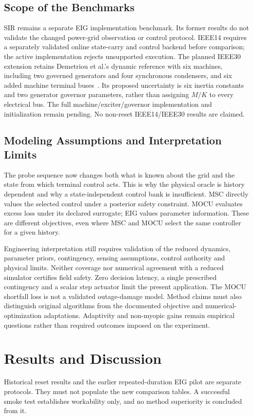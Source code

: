 \documentclass[journal]{IEEEtran}
\begin{document}
\subsection{Scope of the Benchmarks}
SIR remains a separate EIG implementation benchmark. Its former results do
not validate the changed power-grid observation or control protocol.
IEEE14 requires a separately validated online state-carry and control backend
before comparison; the active implementation rejects unsupported execution.
The planned IEEE30 extension retains Demetriou et al.'s dynamic reference
with six machines, including two governed generators and four synchronous
condensers, and six added machine terminal buses~\cite{demetriou2017dynamic}.
Its proposed uncertainty is six inertia constants and two generator governor
parameters, rather than assigning $M/K$ to every electrical bus. The full
machine/exciter/governor implementation and initialization remain pending.
No non-reset IEEE14/IEEE30 results are claimed.

\subsection{Modeling Assumptions and Interpretation Limits}
The probe sequence now changes both what is known about the grid and the
state from which terminal control acts. This is why the physical oracle is
history dependent and why a state-independent control bank is insufficient.
MSC directly values the selected control under a posterior safety constraint.
MOCU evaluates excess loss under its declared surrogate; EIG values parameter
information. These are different objectives, even where MSC and MOCU select
the same controller for a given history.

Engineering interpretation still requires validation of the reduced dynamics,
parameter priors, contingency, sensing assumptions, control authority and
physical limits. Neither coverage nor numerical agreement with a reduced
simulator certifies field safety. Zero decision latency, a single prescribed
contingency and a scalar step actuator limit the present application.
The MOCU shortfall loss is not a validated outage-damage model. Method claims
must also distinguish original algorithms from the documented objective and
numerical-optimization adaptations. Adaptivity and non-myopic gains remain
empirical questions rather than required outcomes imposed on the experiment.

\section{Results and Discussion}
\label{sec:results}
Historical reset results and the earlier repeated-duration EIG pilot are
separate protocols. They must not populate the new comparison tables. A
successful smoke test establishes workability only, and no method superiority
is concluded from it.
\end{document}

